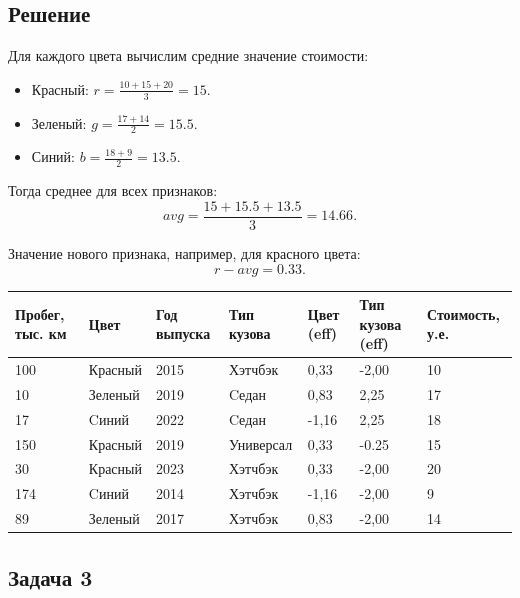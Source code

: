 \subsection*{Решение}

Для каждого цвета вычислим средние значение стоимости:
\begin{itemize}
    \item Красный: $r = \frac{10+15+20}{3}=15$.
    \item Зеленый: $g = \frac{17+14}{2}=15.5$.
    \item Синий: $b = \frac{18+9}{2}=13.5$.
\end{itemize}

Тогда среднее для всех признаков:
$$ avg = \frac{15 + 15.5 + 13.5}{3} = 14.66. $$

Значение нового признака, например, для красного цвета:
$$ r - avg = 0.33. $$

\begin{table}[ht]
    \footnotesize
    \begin{tabular}{lllllll}
        \hline
        Пробег, тыс. км & Цвет    & Год выпуска & Тип кузова & Цвет (eff) & Тип кузова (eff) & Стоимость, у.е. \\ \hline
        100             & Красный & 2015        & Хэтчбэк    & 0,33       & -2,00            & 10              \\
        10              & Зеленый & 2019        & Cедан      & 0,83       & 2,25             & 17              \\
        17              & Cиний   & 2022        & Cедан      & -1,16      & 2,25             & 18              \\
        150             & Красный & 2019        & Универсал  & 0,33       & -0.25            & 15              \\
        30              & Красный & 2023        & Хэтчбэк    & 0,33       & -2,00            & 20              \\
        174             & Cиний   & 2014        & Хэтчбэк    & -1,16      & -2,00            & 9               \\
        89              & Зеленый & 2017        & Хэтчбэк    & 0,83       & -2,00            & 14              \\ \hline
    \end{tabular}
\end{table}

\subsection*{Задача 3}

